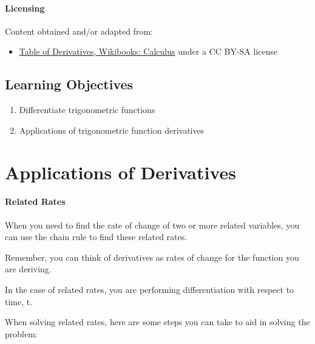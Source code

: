 \paragraph{Licensing}



Content obtained and/or adapted from:

\begin{itemize}
    \item \href{https://en.wikibooks.org/wiki/Calculus/Tables_of_Derivatives}{Table of Derivatives, Wikibooks: Calculus} under a CC BY-SA license
\end{itemize}

\subsection{Learning Objectives}

\begin{enumerate}
    \item Differentiate trigonometric functions
    \item Applications of trigonometric function derivatives
\end{enumerate}

\section{Applications of Derivatives}
\label{sec:applications-of-derivatives}

\paragraph{Related Rates}



When you need to find the rate of change of two or more related variables, you can use the chain rule to find these related rates.



Remember, you can think of derivatives as rates of change for the function you are deriving.



In the case of related rates, you are performing differentiation with respect to time, t.



When solving related rates, here are some steps you can take to aid in solving the problem:



